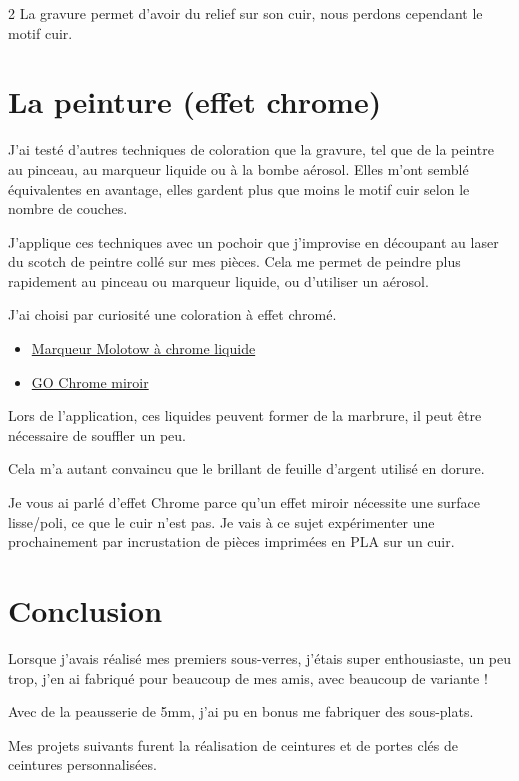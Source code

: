 \documentclass[a4paper,11pt]{article}
\begin{document}
\begin{blogmain}
\begin{multicols}{2}
  La gravure permet d'avoir du relief sur son cuir, nous perdons cependant le motif cuir.

\end{multicols}

\newpage
\section{La peinture (effet chrome)}
J'ai testé d'autres techniques de coloration que la gravure, tel que de la peintre au pinceau, au marqueur liquide ou à la bombe aérosol.
Elles m'ont semblé équivalentes en avantage, elles gardent plus que moins le motif cuir selon le nombre de couches.

J'applique ces techniques avec un pochoir que j'improvise en découpant au laser du scotch de peintre collé sur mes pièces.
Cela me permet de peindre plus rapidement au pinceau ou marqueur liquide, ou d'utiliser un aérosol.

J'ai choisi par curiosité une coloration à effet chromé.
\begin{itemize}
  \item \href{https://molotow.fr/marqueur-effet-miroir-molotow-liquid-chrome.html}{Marqueur Molotow à chrome liquide}
  \item \href{https://www.stardustcolors.com/peinture-chrome/1274-chrome-brush-peinture-chrome-au-pinceau.html}{GO Chrome miroir}
\end{itemize}

Lors de l'application, ces liquides peuvent former de la marbrure, il peut être nécessaire de souffler un peu.

Cela m'a autant convaincu que le brillant de feuille d'argent utilisé en dorure.

Je vous ai parlé d'effet Chrome parce qu'un effet miroir nécessite une surface lisse/poli, ce que le cuir n'est pas.
Je vais à ce sujet expérimenter une prochainement par incrustation de pièces imprimées en PLA sur un cuir.


\section{Conclusion}
Lorsque j'avais réalisé mes premiers sous-verres, j'étais super enthousiaste, un peu trop, j'en ai fabriqué pour beaucoup de mes amis, avec beaucoup de variante !

Avec de la peausserie de 5mm, j'ai pu en bonus me fabriquer des sous-plats.

Mes projets suivants furent la réalisation de ceintures et de portes clés de ceintures personnalisées.


\end{blogmain}
\end{document}
